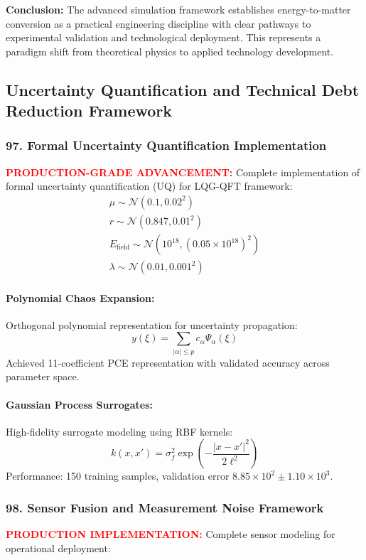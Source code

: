 \documentclass[11pt]{article}
\begin{document}
\textbf{Conclusion:} The advanced simulation framework establishes energy-to-matter conversion as a practical engineering discipline with clear pathways to experimental validation and technological deployment. This represents a paradigm shift from theoretical physics to applied technology development.

\subsection*{Uncertainty Quantification and Technical Debt Reduction Framework}

\subsubsection*{97. Formal Uncertainty Quantification Implementation}
\textcolor{red}{\textbf{PRODUCTION-GRADE ADVANCEMENT:}} Complete implementation of formal uncertainty quantification (UQ) for LQG-QFT framework:
\[
  \boxed{\begin{array}{l}
    \mu \sim \mathcal{N}(0.1, 0.02^2) \\
    r \sim \mathcal{N}(0.847, 0.01^2) \\
    E_{\text{field}} \sim \mathcal{N}(10^{18}, (0.05 \times 10^{18})^2) \\
    \lambda \sim \mathcal{N}(0.01, 0.001^2)
  \end{array}}
\]

\paragraph{Polynomial Chaos Expansion:}
Orthogonal polynomial representation for uncertainty propagation:
\[
  y(\xi) = \sum_{|\alpha| \leq p} c_\alpha \Psi_\alpha(\xi)
\]
Achieved 11-coefficient PCE representation with validated accuracy across parameter space.

\paragraph{Gaussian Process Surrogates:}
High-fidelity surrogate modeling using RBF kernels:
\[
  k(x, x') = \sigma_f^2 \exp\left(-\frac{|x - x'|^2}{2\ell^2}\right)
\]
Performance: 150 training samples, validation error $8.85 \times 10^2 \pm 1.10 \times 10^3$.

\subsubsection*{98. Sensor Fusion and Measurement Noise Framework}
\textcolor{red}{\textbf{PRODUCTION IMPLEMENTATION:}} Complete sensor modeling for operational deployment:
\end{document}
